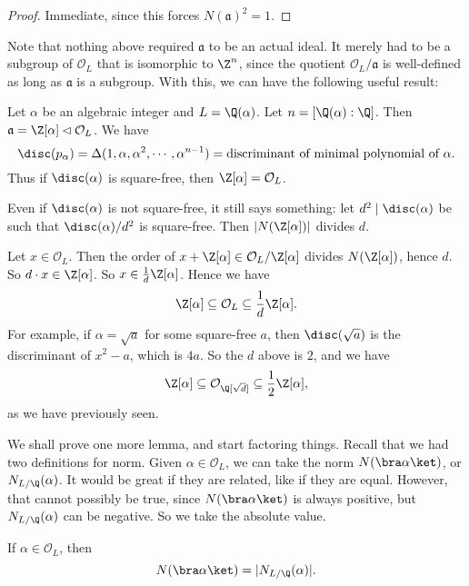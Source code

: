 \documentclass[a4paper]{article}
\begin{document}
\begin{proof}
  Immediate, since this forces $N(\mathfrak{a})^2 = 1$.
\end{proof}

Note that nothing above required $\mathfrak{a}$ to be an actual ideal. It merely had to be a subgroup of $\mathcal{O}_L$ that is isomorphic to $\Z^n$, since the quotient $\mathcal{O}_L/\mathfrak{a}$ is well-defined as long as $\mathfrak{a}$ is a subgroup. With this, we can have the following useful result:

\begin{eg}
  Let $\alpha$ be an algebraic integer and $L = \Q(\alpha)$. Let $n = [\Q(\alpha):\Q]$. Then $\mathfrak{a} = \Z[\alpha] \lhd \mathcal{O}_L$. We have
  \[
    \disc(p_\alpha) = \Delta(1, \alpha, \alpha^2, \cdots, \alpha^{n - 1}) = \text{discriminant of minimal polynomial of }\alpha.
  \]
  Thus if $\disc(\alpha)$ is square-free, then $\Z[\alpha] = \mathcal{O}_L$.

  Even if $\disc(\alpha)$ is not square-free, it still says something: let $d^2 \mid \disc(\alpha)$ be such that $\disc(\alpha)/d^2$ is square-free. Then $|N(\Z[\alpha])|$ divides $d$.

  Let $x \in \mathcal{O}_L$. Then the order of $x + \Z[\alpha] \in \mathcal{O}_L/\Z[\alpha]$ divides $N(\Z[\alpha])$, hence $d$. So $d \cdot x \in \Z[\alpha]$. So $x \in \frac{1}{d} \Z[\alpha]$. Hence we have
  \[
    \Z[\alpha] \subseteq \mathcal{O}_L \subseteq \frac{1}{d} \Z[\alpha].
  \]
  For example, if $\alpha = \sqrt{a}$ for some square-free $a$, then $\disc(\sqrt{a})$ is the discriminant of $x^2 - a$, which is $4a$. So the $d$ above is $2$, and we have
  \[
    \Z[\alpha] \subseteq \mathcal{O}_{\Q[\sqrt{d}]} \subseteq \frac{1}{2} \Z[\alpha],
  \]
  as we have previously seen.

\end{eg}

We shall prove one more lemma, and start factoring things. Recall that we had two definitions for norm. Given $\alpha \in \mathcal{O}_L$, we can take the norm $N(\bra \alpha\ket)$, or $N_{L/\Q}(\alpha)$. It would be great if they are related, like if they are equal. However, that cannot possibly be true, since $N(\bra \alpha\ket)$ is always positive, but $N_{L/\Q}(\alpha)$ can be negative. So we take the absolute value.
\begin{lemma}
  If $\alpha \in \mathcal{O}_L$, then
  \[
    N(\bra \alpha\ket) = |N_{L/\Q}(\alpha)|.
  \]
\end{lemma}
\end{document}
